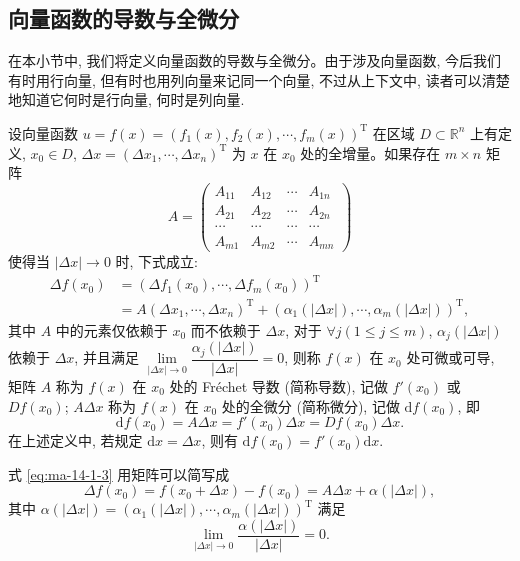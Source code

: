\subsection{向量函数的导数与全微分}
\label{subsec:ma-14-1-5}

在本小节中, 我们将定义向量函数的导数与全微分。由于涉及向量函数, 今后我们有时用行向量, 但有时也用列向量来记同一个向量, 不过从上下文中, 读者可以清楚地知道它何时是行向量, 何时是列向量.

\begin{definition}\label{definition:ma-14-1-5}
设向量函数 $u=f(x)=(f_1(x),f_2(x),\cdots,f_m(x))^\mathrm T$ 在区域 $D\subset\mathbb R^n$ 上有定义, $x_0\in D$, $\Delta x=(\Delta x_1,\cdots,\Delta x_n)^\mathrm T$ 为 $x$ 在 $x_0$ 处的全增量。如果存在 $m\times n$ 矩阵
\[
  A=
  \begin{pmatrix}
    A_{11}&A_{12}&\cdots&A_{1n}\\
    A_{21}&A_{22}&\cdots&A_{2n}\\
    \cdots&\cdots&\cdots&\cdots\\
    A_{m1}&A_{m2}&\cdots&A_{mn}
  \end{pmatrix}
\]
使得当 $|\Delta x|\to0$ 时, 下式成立:
\begin{equation}
\begin{aligned}
  \Delta f(x_0)
  &=(\Delta f_1(x_0),\cdots,\Delta f_m(x_0))^\mathrm T\\
  &=A(\Delta x_1,\cdots,\Delta x_n)^\mathrm T
  +(\alpha_1(|\Delta x|),\cdots,\alpha_m(|\Delta x|))^\mathrm T,
\end{aligned}
\label{eq:ma-14-1-3}
\end{equation}
其中 $A$ 中的元素仅依赖于 $x_0$ 而不依赖于 $\Delta x$, 对于 $\forall j(1\leqslant j\leqslant m)$, $\alpha_j(|\Delta x|)$ 依赖于 $\Delta x$, 并且满足 $\lim\limits_{|\Delta x|\to0}\dfrac{\alpha_j(|\Delta x|)}{|\Delta x|}=0$, 则称 $f(x)$ 在 $x_0$ 处可微或可导, 矩阵 $A$ 称为 $f(x)$ 在 $x_0$ 处的 Fréchet 导数 (简称导数), 记做 $f'(x_0)$ 或 $Df(x_0)$; $A\Delta x$ 称为 $f(x)$ 在 $x_0$ 处的全微分 (简称微分), 记做 $\mathrm df(x_0)$, 即
\[
  \mathrm df(x_0)=A\Delta x=f'(x_0)\Delta x=Df(x_0)\Delta x.
\]
在上述定义中, 若规定 $\mathrm dx=\Delta x$, 则有 $\mathrm df(x_0)=f'(x_0)\mathrm dx$.
\end{definition}

式 \eqref{eq:ma-14-1-3} 用矩阵可以简写成
\[
  \Delta f(x_0)=f(x_0+\Delta x)-f(x_0)=A\Delta x+\alpha(|\Delta x|),
\]
其中 $\alpha(|\Delta x|)=(\alpha_1(|\Delta x|),\cdots,\alpha_m(|\Delta x|))^\mathrm T$ 满足
\[
  \lim_{|\Delta x|\to0}\frac{\alpha(|\Delta x|)}{|\Delta x|}=0.
\]

